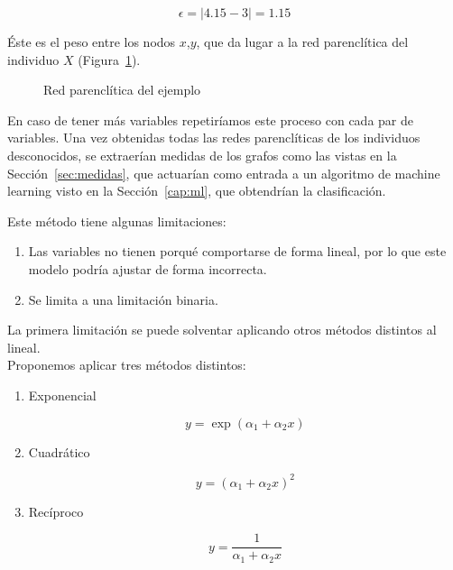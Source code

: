 \begin{ejemplo}
	\begin{equation*}
	\epsilon = |4.15 - 3| = 1.15
	\end{equation*}
	
	Éste es el peso entre los nodos $x$,$y$, que da lugar a la red parenclítica del individuo $X$ (Figura~\ref{fig:red_par}).\\
	
	\begin{figure}[htbp!]
		\centering
		\ejemploredparenclitica
		\caption{Red parenclítica del ejemplo}
		\label{fig:red_par}
	\end{figure}
	
	En caso de tener más variables repetiríamos este proceso con cada par de variables. Una vez obtenidas todas las redes parenclíticas de los individuos desconocidos, se extraerían medidas de los grafos como las vistas en la Sección~\ref{sec:medidas}, que actuarían como entrada a un algoritmo de machine learning visto en la Sección~\ref{cap:ml}, que obtendrían la clasificación. 
\end{ejemplo}

Este método tiene algunas limitaciones:

\begin{enumerate}
	\item Las variables no tienen porqué comportarse de forma lineal, por lo que este modelo podría ajustar de forma incorrecta.
	\item Se limita a una limitación binaria. 
\end{enumerate}

La primera limitación se puede solventar aplicando otros métodos distintos al lineal.\\

Proponemos aplicar tres métodos distintos:

\begin{enumerate}
	\item Exponencial
	
	\begin{equation}
	y = \exp(\alpha_1 + \alpha_2 x)
	\end{equation}
	
	\item Cuadrático
	
	\begin{equation}
	y = (\alpha_1 + \alpha_2 x)^2
	\end{equation}
	
	\item Recíproco
	
	\begin{equation}
	y = \dfrac{1}{\alpha_1 + \alpha_2 x}
	\end{equation}
\end{enumerate}

